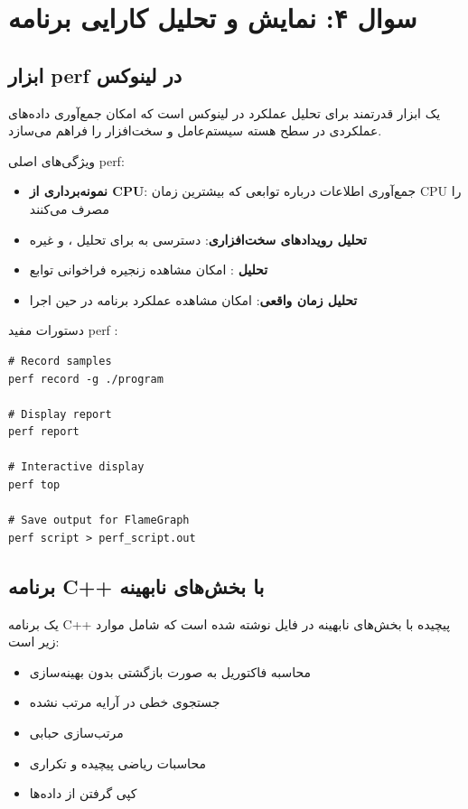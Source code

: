\documentclass{article}
\begin{document}
\section{سوال ۴: نمایش و تحلیل کارایی برنامه}

\subsection{ابزار perf در لینوکس}

 یک ابزار قدرتمند برای تحلیل عملکرد در لینوکس است که امکان جمع‌آوری داده‌های عملکردی در سطح هسته سیستم‌عامل و سخت‌افزار را فراهم می‌سازد.

ویژگی‌های اصلی perf:
\begin{itemize}
    \item \textbf{نمونه‌برداری از CPU}: جمع‌آوری اطلاعات درباره توابعی که بیشترین زمان CPU را مصرف می‌کنند
    \item \textbf{تحلیل رویدادهای سخت‌افزاری}: دسترسی به  برای تحلیل ،  و غیره
    \item \textbf{تحلیل }: امکان مشاهده زنجیره فراخوانی توابع
    \item \textbf{تحلیل زمان واقعی}: امکان مشاهده عملکرد برنامه در حین اجرا
\end{itemize}

دستورات مفید perf :
\begin{LTR}
\begin{verbatim}
# Record samples
perf record -g ./program

# Display report
perf report

# Interactive display
perf top

# Save output for FlameGraph
perf script > perf_script.out
\end{verbatim}
\end{LTR}

\subsection{برنامه C++ با بخش‌های نابهینه}

یک برنامه C++ پیچیده با بخش‌های نابهینه در فایل  نوشته شده است که شامل موارد زیر است:

\begin{itemize}
    \item محاسبه فاکتوریل به صورت بازگشتی بدون بهینه‌سازی
    \item جستجوی خطی در آرایه مرتب نشده
    \item مرتب‌سازی حبابی 
    \item محاسبات ریاضی پیچیده و تکراری
    \item کپی گرفتن از داده‌ها
\end{itemize}
\end{document}
